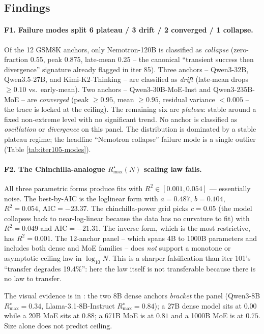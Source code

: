 \subsection*{Findings}

\paragraph{F1. Failure modes split 6 plateau / 3 drift / 2 converged / 1 collapse.}
Of the 12 GSM8K anchors, only Nemotron-120B is classified as
\emph{collapse} (zero-fraction 0.55, peak 0.875, late-mean 0.25 -- the
canonical ``transient success then divergence'' signature already
flagged in iter 85).  Three anchors -- Qwen3-32B, Qwen3.5-27B, and
Kimi-K2-Thinking -- are classified as \emph{drift} (late-mean drops
$\geq 0.10$ vs.\ early-mean).  Two anchors -- Qwen3-30B-MoE-Inst and
Qwen3-235B-MoE -- are \emph{converged} (peak $\geq 0.95$, mean
$\geq 0.95$, residual variance $< 0.005$ -- the trace is locked at the
ceiling).  The remaining six are \emph{plateau}: stable around a fixed
non-extreme level with no significant trend.  No anchor is classified
as \emph{oscillation} or \emph{divergence} on this panel.  The
distribution is dominated by a stable plateau regime; the headline
``Nemotron collapse'' failure mode is a single outlier (Table
\ref{tab:iter105-modes}).

\paragraph{F2. The Chinchilla-analogue $R_\mathrm{max}^\star(N)$ scaling law fails.}
All three parametric forms produce fits with $R^2 \in [0.001, 0.054]$
--- essentially noise.  The best-by-AIC is the loglinear form with
$a = 0.487$, $b = 0.104$, $R^2 = 0.054$, $\mathrm{AIC} = -23.37$.  The
chinchilla-power grid picks $c = 0.05$ (the model collapses back to
near-log-linear because the data has no curvature to fit) with
$R^2 = 0.049$ and $\mathrm{AIC} = -21.31$.  The inverse form, which is
the most restrictive, has $R^2 = 0.001$.  The 12-anchor panel --
which spans 4B to 1000B parameters and includes both dense and MoE
families -- does \emph{not} support a monotone or asymptotic ceiling
law in $\log_{10} N$.  This is a sharper falsification than iter 101's
``transfer degrades 19.4\%'': here the law itself is not transferable
because there is no law to transfer.

The visual evidence is in
: the
two 8B dense anchors \emph{bracket} the panel (Qwen3-8B
$R_\mathrm{max}^\star = 0.34$, Llama-3.1-8B-Instruct
$R_\mathrm{max}^\star = 0.84$); a 27B dense model sits at $0.00$
while a 20B MoE sits at $0.88$; a 671B MoE is at $0.81$ and a 1000B
MoE is at $0.75$.  Size alone does not predict ceiling.

